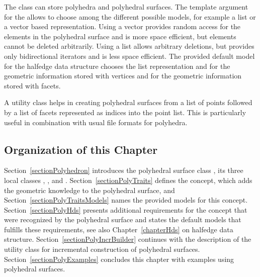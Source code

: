 The class  can store polyhedra and polyhedral
surfaces. The template argument for the 
allows to choose among the different possible models, for example a
list or a vector based representation.  Using a vector provides random
access for the elements in the polyhedral surface and is more space
efficient, but elements cannot be deleted arbitrarily. Using a list
allows arbitrary deletions, but provides only bidirectional iterators
and is less space efficient. The provided default model for the
halfedge data structure
 chooses the
list representation and  for the geometric
information stored with vertices and  for the
geometric information stored with facets.

A utility class  helps in
creating polyhedral surfaces from a list of points followed by a list
of facets represented as indices into the point list. This is
particularly useful in combination with usual file formats for polyhedra.

\subsection*{Organization of this Chapter}

Section~\ref{sectionPolyhedron} introduces the polyhedral surface
class , its three local classes ,
, and . Section~\ref{sectionPolyTraits}
defines the  concept, which adds the geometric
knowledge to the polyhedral surface, and
Section~\ref{sectionPolyTraitsModels} names the provided models for
this concept.  Section~\ref{sectionPolyHds} presents additional
requirements for the  concept that were
recognized by the polyhedral surface and states the default models
that fulfills these requirements, see also Chapter~\ref{chapterHds} on
halfedge data structure. Section~\ref{sectionPolyIncrBuilder}
continues with the description of the utility class for incremental
construction of polyhedral surfaces.
Section~\ref{sectionPolyExamples} concludes this chapter with examples
using polyhedral surfaces.

